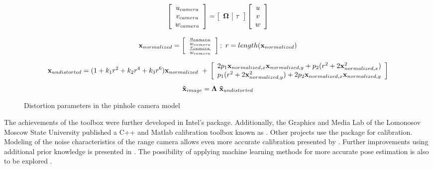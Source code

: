 \documentclass{ucl_thesis}
\begin{document}
\begin{figure}[h!]
    \begin{equation*}
	\left[\begin{array}{c}
		u_{camera} \\
		v_{camera} \\
		w_{camera} \\
	\end{array} \right]
	=
    	\left[\begin{array}{c|c}
	    	{\bf \Omega} & {\bf \tau}
	\end{array} \right]
	\left[\begin{array}{c}
	    u \\
	    	v \\
	    w \\
	\end{array} \right]
    \end{equation*}
    
    \begin{equation*}
	{\bf x}_{normalized} = 
 	\left[\begin{array}{c}
	    \frac{ u_{camera} }{ w_{camera} } \\
	    \frac{ v_{camera} }{ w_{camera} } \\
	\end{array} \right]; 
	~r = length(	{\bf x}_{normalized} )
    \end{equation*}

    \begin{equation*}
	{\bf x}_{undistorted}
	=
	(1 + k_1 r^2 + k_2 r^4 + k_3 r^6 ) {\bf x}_{normalized} 
	~+~\\ 
	\left[\begin{array}{c}
	    2 p_1 {\bf x}_{normalized,x} {\bf x}_{normalized,y} + p_2 ( r^2 + 2{\bf x}_{normalized,x}^2) \\
	    p_1(r^2+2{\bf x}_{normalized,y}^2) + 2 p_2 {\bf x}_{normalized,x} {\bf x}_{normalized,y}\\
	\end{array} \right]
	\end{equation*}
    \begin{equation*}
		{\bf \tilde{x}}_{image} = {\bf\Lambda} ~ {\bf \tilde{x}}_{undistorted}
    \end{equation*}
    
    \caption{Distortion parameters in the pinhole camera model}
    \label{eq:distortion}
\end{figure}

The achievements of the toolbox were further developed in Intel's \citep{calibration_opencv} package. Additionally, the Graphics and Media Lab of the Lomonosov Moscow State University published a C++ and Matlab calibration toolbox known as \citep{calibration_gml}. Other projects use the \citep{calibration_rgbdemo} package for calibration. Modeling of the noise characteristics of the range camera allows even more accurate calibration presented by \citep{calibration_herrera}. Further improvements using additional prior knowledge is presented in \citep{Herrera:LearnedJointMRF}. The possibility of applying machine learning methods for more accurate pose estimation is also to be explored \citep{malisiewicz-iccv11}.
\end{document}
